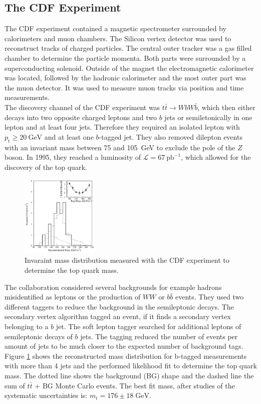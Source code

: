 \subsection{The CDF Experiment}
The CDF experiment contained a magnetic spectrometer surrounded by calorimeters and muon chambers. The Silicon vertex detector was used to reconstruct tracks of charged particles. The central outer tracker was a gas filled chamber to determine the particle momenta. Both parts were surrounded by a superconducting solenoid. Outside of the magnet the electromagnetic calorimeter was located, followed by the hadronic calorimeter and the most outer part was the muon detector. It was used to measure muon tracks via position and time measurements.\\
The discovery channel of the CDF experiment was $t\bar{t} \rightarrow WbW\bar{b}$, which then either decays into two opposite charged leptons and two $b$ jets or semiletonically in one lepton and at least four jets. Therefore they required an isolated lepton with $p_{\text{t}}\geq \SI{20}{\GeV}$ and at least one $b$-tagged jet. They also removed dilepton events with an invariant mass between 75 and \SI{105}{\GeV} to exclude the pole of the $Z$ boson.
In 1995, they reached a luminosity of $\mathcal{L} = \SI{67}{\pico\barn}^{-1}$, which allowed for the discovery of the top quark.

\begin{figure}
    \includegraphics[width=0.33\textwidth]{graphics/CDF.png}
    \caption{Invaraint mass distribution measured with the CDF experiment to determine the top quark mass.\cite{top-quark}}
		\label{fig:CDF}
  \end{figure}
  \FloatBarrier
The collaboration considered several backgrounds for example hadrons misidentified as leptons or the production of $WW$ or $b\bar{b}$ events. They used two different taggers to reduce the background in the semileptonic decays. The secondary vertex algorithm tagged an event, if it finds a secondary vertex belonging to a $b$ jet. The soft lepton tagger searched for additional leptons of semileptonic decays of $b$ jets. The tagging reduced the number of events per amount of jets to be much closer to the expected number of background tags.\\
Figure \ref{fig:CDF} shows the reconstructed mass distribution for b-tagged measurements with more than 4 jets and the performed likelihood fit to determine the top quark mass. The dotted line shows the background (BG) shape and the dashed line the sum of $t\bar{t}$ + BG Monte Carlo events.
The best fit mass, after studies of the systematic uncertainties is:
$m_{t} = 176 \pm 18 \;\si{\GeV} $.
